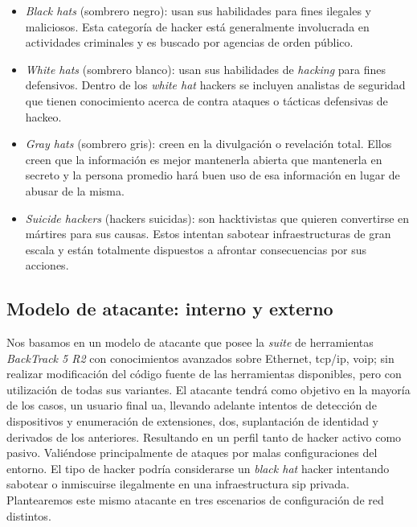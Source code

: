 \documentclass[a4paper,12pt]{report}
\begin{document}
\begin{itemize}
\item \emph{Black hats} (sombrero negro): usan sus habilidades
para fines ilegales y maliciosos. Esta categoría de hacker está generalmente
involucrada en actividades criminales y es buscado por agencias de orden
público.

\item \emph{White hats} (sombrero blanco): usan
sus habilidades de \emph{hacking} para fines defensivos. Dentro de los \emph{white
hat} hackers se incluyen analistas de seguridad que tienen conocimiento acerca
de contra ataques o tácticas defensivas de hackeo.

\item \emph{Gray hats} (sombrero gris): creen en la divulgación
o revelación total. Ellos creen que la información es mejor mantenerla
abierta que mantenerla en secreto y la persona promedio hará buen uso de
esa información en lugar de abusar de la misma. 

\item \emph{Suicide hackers} (hackers suicidas): son hacktivistas
que quieren convertirse en mártires para sus causas. Estos intentan sabotear
infraestructuras de gran escala y están totalmente dispuestos a afrontar
consecuencias por sus acciones.
\end{itemize}

\cite{eccouncil}

\subsection{Modelo de atacante: interno y externo}
\label{modelo_atacante}
Nos basamos en un modelo de atacante que posee la \emph{suite} de herramientas
\emph{BackTrack 5 R2} con conocimientos avanzados sobre Ethernet, \ac{tcp}/\ac{ip}, \ac{voip}; 
sin realizar modificación del código fuente de las herramientas disponibles,
pero con utilización de todas sus variantes. El atacante tendrá como objetivo
en la mayoría de los casos, un usuario final \ac{ua}, 
llevando adelante intentos de detección de dispositivos y enumeración de
extensiones, \ac{dos}, suplantación de  identidad y derivados de los
anteriores. Resultando en un perfil tanto de hacker activo como
pasivo. Valiéndose principalmente de ataques por malas
configuraciones del entorno. El tipo de hacker podría considerarse un
\emph{black hat} hacker intentando sabotear o inmiscuirse ilegalmente
en una infraestructura \ac{sip} privada.\\
Plantearemos este mismo atacante en tres escenarios de configuración de red 
distintos. 
\end{document}
